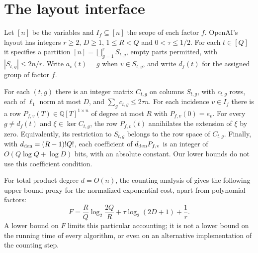 \documentclass[11pt]{article}
\begin{document}
\section{The layout interface}
Let $[n]$ be the variables and $I_f\subseteq[n]$ the scope of each factor $f$. OpenAI's layout has integers $r\ge2$, $D\ge1$, $1\le R<Q$ and $0<\tau\le1/2$. For each $t\in[Q]$ it specifies a partition $[n]=\bigsqcup_{g=1}^r S_{t,g}$, empty parts permitted, with $|S_{t,g}|\le2n/r$. Write $a_v(t)=g$ when $v\in S_{t,g}$, and write $d_f(t)$ for the assigned group of factor $f$.

For each $(t,g)$ there is an integer matrix $C_{t,g}$ on columns $S_{t,g}$, with $c_{t,g}$ rows, each of $\ell_1$ norm at most $D$, and $\sum_g c_{t,g}\le2\tau n$. For each incidence $v\in I_f$ there is a row $P_{f,v}(T)\in\mathbb Q[T]^{1\times n}$ of degree at most $R$ with $P_{f,v}(0)=e_v$. For every $g\ne d_f(t)$ and $\xi\in\ker C_{t,g}$, the row $P_{f,v}(t)$ annihilates the extension of $\xi$ by zero. Equivalently, its restriction to $S_{t,g}$ belongs to the row space of $C_{t,g}$. Finally, with $d_{\rm den}=(R-1)!Q!$, each coefficient of $d_{\rm den}P_{f,v}$ is an integer of $O(Q\log Q+\log D)$ bits, with an absolute constant. Our lower bounds do not use this coefficient condition.

For total product degree $d=O(n)$, the counting analysis of \cite{openai} gives the following upper-bound proxy for the normalized exponential cost, apart from polynomial factors:
\begin{equation}\label{eq:F}
 F=\frac RQ\log_2\frac{2Q}{R}+\tau\log_2(2D+1)+\frac1r.
\end{equation}
A lower bound on $F$ limits this particular accounting; it is not a lower bound on the running time of every algorithm, or even on an alternative implementation of the counting step.
\end{document}
